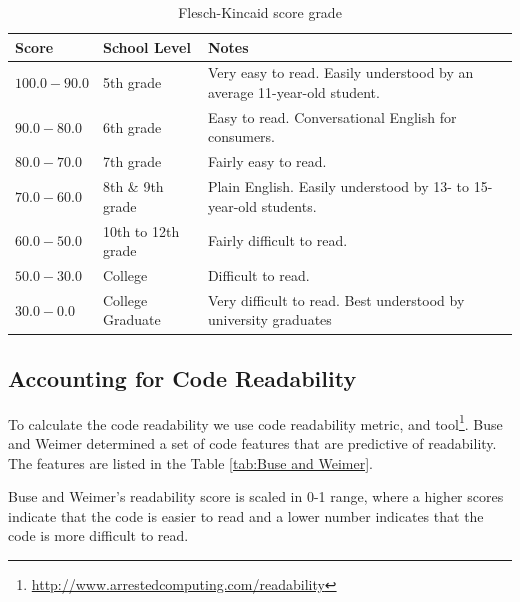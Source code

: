 \documentclass[12pt,mscthesis]{usiinfthesis}
\begin{document}
	\begin {table}[H]
	\begin{center}
    \begin{tabular}{| l | l | p{7cm} | }
    \hline
    \textbf{Score} & \textbf{School Level} & \textbf{Notes} \\ \hline
    $100.0-90.0$ & 5th grade & Very easy to read. Easily understood by an average 11-year-old student.\\ \hline
    $90.0-80.0$ & 6th grade & Easy to read. Conversational English for consumers.\\ \hline
 	$80.0-70.0$ & 7th grade & Fairly easy to read. \\ \hline
	$70.0-60.0$ & 8th \& 9th grade & Plain English. Easily understood by 13- to 15-year-old students.\\ \hline
	$60.0-50.0$ & 10th to 12th grade &  Fairly difficult to read.\\ \hline
	$50.0-30.0$ & College & Difficult to read.\\ \hline
	$30.0-0.0$ & College Graduate & Very difficult to read. Best understood by university graduates\\\hline

    \end{tabular}
	\end{center}
	\caption{Flesch-Kincaid score grade} \label{tab:Flesch-Kincaid} 
	\end{table}

\subsection{Accounting for Code Readability}
	To calculate the code readability we use \citet{Buse:2010:LMC:1850489.1850615} code readability metric, and tool\footnote{\url{http://www.arrestedcomputing.com/readability}}.
	 Buse and Weimer determined a set of code features that are predictive of readability. The features are listed in the Table \ref{tab:Buse and Weimer}.


	Buse and Weimer's readability score is scaled in 0-1 range, where a higher scores indicate that the code is easier to read and a lower number indicates that the code is more difficult to read.
\end{document}
